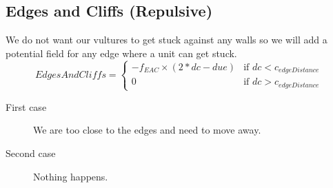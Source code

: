 	\subsection{Edges and Cliffs (Repulsive)}
		We do not want our vultures to get stuck against any walls so we will add a potential field for any edge where a unit can get stuck.
		\begin{displaymath}
			EdgesAndCliffs = \begin{cases}
					-f_{EAC} \times {(2*dc - due)} & \text{if } dc < c_{edgeDistance}\\
					0 & \text{if } dc > c_{edgeDistance}
				\end{cases}		
		\end{displaymath}
	\begin{description}	
		\item[First case] We are too close to the edges and need to move away.  
		\item[Second case] Nothing happens. 
    \end{description}
     

